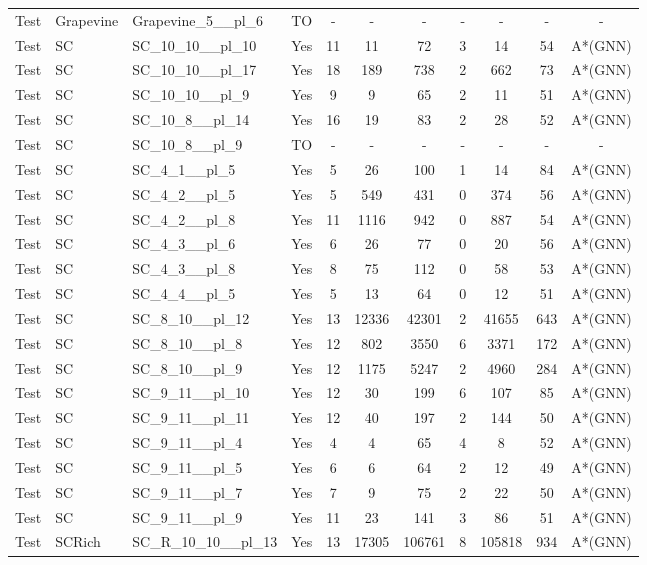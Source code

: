 \documentclass{article}
\begin{document}
\begin{tabular}{lllcccccccc}
Test & Grapevine & Grapevine\_5\_\_pl\_6 & TO & - & - & - & - & - & - & - \\
Test & SC & SC\_10\_10\_\_pl\_10 & Yes & 11 & 11 & 72 & 3 & 14 & 54 & A*(GNN) \\
Test & SC & SC\_10\_10\_\_pl\_17 & Yes & 18 & 189 & 738 & 2 & 662 & 73 & A*(GNN) \\
Test & SC & SC\_10\_10\_\_pl\_9 & Yes & 9 & 9 & 65 & 2 & 11 & 51 & A*(GNN) \\
Test & SC & SC\_10\_8\_\_pl\_14 & Yes & 16 & 19 & 83 & 2 & 28 & 52 & A*(GNN) \\
Test & SC & SC\_10\_8\_\_pl\_9 & TO & - & - & - & - & - & - & - \\
Test & SC & SC\_4\_1\_\_pl\_5 & Yes & 5 & 26 & 100 & 1 & 14 & 84 & A*(GNN) \\
Test & SC & SC\_4\_2\_\_pl\_5 & Yes & 5 & 549 & 431 & 0 & 374 & 56 & A*(GNN) \\
Test & SC & SC\_4\_2\_\_pl\_8 & Yes & 11 & 1116 & 942 & 0 & 887 & 54 & A*(GNN) \\
Test & SC & SC\_4\_3\_\_pl\_6 & Yes & 6 & 26 & 77 & 0 & 20 & 56 & A*(GNN) \\
Test & SC & SC\_4\_3\_\_pl\_8 & Yes & 8 & 75 & 112 & 0 & 58 & 53 & A*(GNN) \\
Test & SC & SC\_4\_4\_\_pl\_5 & Yes & 5 & 13 & 64 & 0 & 12 & 51 & A*(GNN) \\
Test & SC & SC\_8\_10\_\_pl\_12 & Yes & 13 & 12336 & 42301 & 2 & 41655 & 643 & A*(GNN) \\
Test & SC & SC\_8\_10\_\_pl\_8 & Yes & 12 & 802 & 3550 & 6 & 3371 & 172 & A*(GNN) \\
Test & SC & SC\_8\_10\_\_pl\_9 & Yes & 12 & 1175 & 5247 & 2 & 4960 & 284 & A*(GNN) \\
Test & SC & SC\_9\_11\_\_pl\_10 & Yes & 12 & 30 & 199 & 6 & 107 & 85 & A*(GNN) \\
Test & SC & SC\_9\_11\_\_pl\_11 & Yes & 12 & 40 & 197 & 2 & 144 & 50 & A*(GNN) \\
Test & SC & SC\_9\_11\_\_pl\_4 & Yes & 4 & 4 & 65 & 4 & 8 & 52 & A*(GNN) \\
Test & SC & SC\_9\_11\_\_pl\_5 & Yes & 6 & 6 & 64 & 2 & 12 & 49 & A*(GNN) \\
Test & SC & SC\_9\_11\_\_pl\_7 & Yes & 7 & 9 & 75 & 2 & 22 & 50 & A*(GNN) \\
Test & SC & SC\_9\_11\_\_pl\_9 & Yes & 11 & 23 & 141 & 3 & 86 & 51 & A*(GNN) \\
Test & SCRich & SC\_R\_10\_10\_\_pl\_13 & Yes & 13 & 17305 & 106761 & 8 & 105818 & 934 & A*(GNN) \\

\end{tabular}
\end{document}
